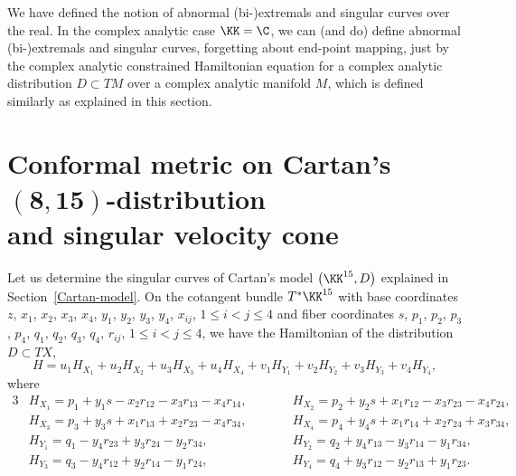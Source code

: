 \begin{Remark}
We have defined the notion of abnormal (bi-)extremals and singular curves over the real.
In the complex analytic case $\KK = \C$, we can (and do) define abnormal (bi-)extremals and singular curves, forgetting
about end-point mapping,
just by the complex analytic constrained Hamiltonian equation for a complex analytic distribution $D \subset TM$
over a complex analytic manifold $M$, which is defined similarly as explained in this section.
\end{Remark}


\section[Conformal metric on Cartan's (8, 15)-distribution and singular velocity cone]{Conformal metric on Cartan's $\boldsymbol{(8, 15)}$-distribution\\ and singular velocity cone}
\label{Singular-velocity}

Let us determine the singular curves of Cartan's model $\bigl(\KK^{15}, D\bigr)$
explained in Section~\ref{Cartan-model}.
On the cotangent bundle $T^*\KK^{15}$ with base coordinates
$z$, $x_1$, $x_2$, $x_3$, $x_4$, $y_1$, $y_2$, $y_3$, $y_4$, $x_{ij}$, ${1 \leq i < j \leq 4}$ and
fiber coordinates
$s$, $p_1$, $p_2$, $p_3$, $p_4$, $q_1$, $q_2$, $q_3$, $q_4$, $r_{ij}$, $1 \leq i < j \leq 4$,
we have the Hamiltonian of the distribution $D \subset TX$,
\[
H = u_1H_{X_1} + u_2H_{X_2} + u_3H_{X_3} + u_4H_{X_4} + v_1H_{Y_1} + v_2H_{Y_2} + v_3H_{Y_3} + v_4H_{Y_4},
\]
where
\begin{alignat*}{3}
&H_{X_1} = p_1 + y_1s - x_2r_{12} - x_3r_{13} - x_4r_{14}, \qquad&&
H_{X_2} = p_2 + y_2s + x_1r_{12} - x_3r_{23} - x_4r_{24},&
\\
&H_{X_3} = p_3 + y_3s + x_1r_{13} + x_2r_{23} - x_4r_{34}, \qquad&&
H_{X_4} = p_4 + y_4s + x_1r_{14} + x_2r_{24} + x_3r_{34},&
\\
&H_{Y_1} = q_1 - y_4r_{23} + y_3r_{24} - y_2r_{34}, \qquad&&
H_{Y_2} = q_2 + y_4r_{13} - y_3r_{14} - y_1r_{34},&
\\
&H_{Y_3} = q_3 - y_4r_{12} + y_2r_{14} - y_1r_{24}, \qquad&&
H_{Y_4} = q_4 + y_3r_{12} - y_2r_{13} + y_1r_{23}.&
\end{alignat*}

